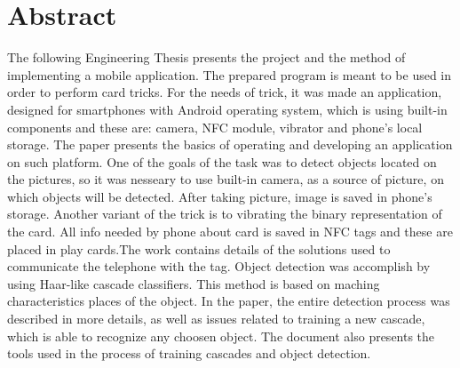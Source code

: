 \section*{Abstract}
The following Engineering Thesis presents the project and the method of implementing a mobile application. The prepared program is meant to be used in order to perform card tricks. For the needs of trick, it was made an application, designed for smartphones with Android operating system, which is using built-in components and these are: camera, NFC module, vibrator and phone's local storage. The paper presents the basics of operating and developing an application on such platform. One of the goals of the task was to detect objects located on the pictures, so it was nesseary to use built-in camera, as a source of picture, on which objects will be detected. After taking picture, image is saved in phone’s storage. Another variant of the trick is to vibrating the binary representation of the card. All info needed by phone about card is saved in NFC tags and these are placed in play cards.The work contains details of the solutions used to communicate the telephone with the tag. Object detection was accomplish by using Haar-like cascade classifiers. This method is based on maching characteristics places of the object. In the paper, the entire detection process was described in more details, as well as issues related to training a new cascade, which is able to recognize any choosen object. The document also presents the tools used in the process of training cascades and object detection.



